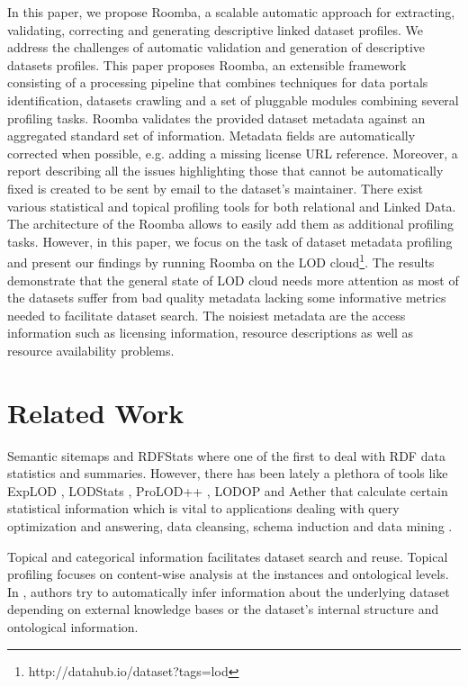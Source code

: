 \documentclass{sig-alternate}
\begin{document}
In this paper, we propose Roomba, a scalable automatic approach for extracting, validating, correcting and generating descriptive linked dataset profiles. We address the challenges of automatic validation and generation of descriptive datasets profiles. This paper proposes Roomba, an extensible framework consisting of a processing pipeline that combines techniques for data portals identification, datasets crawling and a set of pluggable modules combining several profiling tasks. Roomba validates the provided dataset metadata against an aggregated standard set of information. Metadata fields are automatically corrected when possible, e.g. adding a missing license URL reference. Moreover, a report describing all the issues highlighting those that cannot be automatically fixed is created to be sent by email to the dataset's maintainer. There exist various statistical and topical profiling tools for both relational and Linked Data. The architecture of the Roomba allows to easily add them as additional profiling tasks. However, in this paper, we focus on the task of dataset metadata profiling and present our findings by running Roomba on the LOD cloud\footnote{http://datahub.io/dataset?tags=lod}. The results demonstrate that the general state of LOD cloud needs more attention as most of the datasets suffer from bad quality metadata lacking some informative metrics needed to facilitate dataset search. The noisiest metadata are the access information such as licensing information, resource descriptions as well as resource availability problems.

\section{Related Work}

Semantic sitemaps \cite{Cyganiak:2008:SSE:1789394.1789457} and RDFStats \cite{Langegger:2009:RER:1674635.1674691} where one of the first to deal with RDF data statistics and summaries. However, there has been lately a plethora of tools like ExpLOD \cite{Khatchadourian:2010:ESE:2155278.2155300}, LODStats \cite{Auer:2012:LEF:2413941.2413982}, ProLOD++ \cite{6816740}, LODOP \cite{forchhammer_profiles_2014} and Aether \cite{makela-aether-2014} that calculate certain statistical information which is vital to applications dealing with query optimization and answering, data cleansing, schema induction and data mining \cite{profilingWebOfData,6690016}.

Topical and categorical information facilitates dataset search and reuse. Topical profiling focuses on content-wise analysis at the instances and ontological levels. In \cite{6690016,Bohm:2012:LTG:2396761.2398718,scalableApproach}, authors try to automatically infer information about the underlying dataset depending on external knowledge bases or the dataset's internal structure and ontological information.
\end{document}
